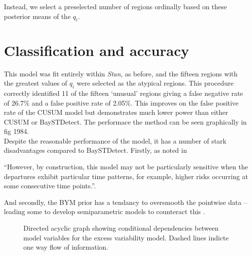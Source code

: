 \documentclass[11pt]{report}
\begin{document}
Instead, we select a preselected number of regions ordinally based on these posterior means of the $q_i$.

\section{Classification and accuracy}

This model was fit entirely within \emph{Stan}, as before, and the fifteen regions with the greatest values of $q_i$ were selected as the atypical regions. This procedure correctly identified 11 of the fifteen `unusual' regions giving a false negative rate of 26.7\% and a false positive rate of 2.05\%. This improves on the false positive rate of the CUSUM model but demonstrates much lower power than either CUSUM or BaySTDetect. The performace the method can be seen graphically in fig 1984. \\

Despite the reasonable performance of the \citet{stability} model, it has a number of stark disadvantages compared to BaySTDetect. Firstly, as noted in \citet{baystdetect}
\begin{displayquote}
``However, by construction, this model may not be particularly sensitive when the departures exhibit particular time patterns, for example, higher risks occurring at some consecutive time points.''.
\end{displayquote}

And secondly, the BYM prior has a tendancy to oversmooth the pointwise data -- leading some to develop semiparametric models to counteract this \citep{best2005comparison}.

\begin{figure}
\centering
{}
\label{fig:baystdetect}
\caption{Directed acyclic graph showing conditional dependencies between model variables for the excess variability model. Dashed lines indicte one way flow of information.}
\end{figure}
\end{document}
